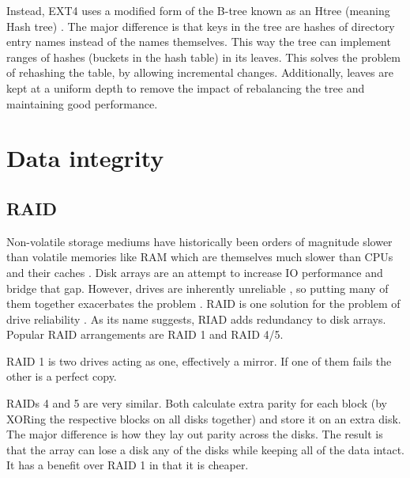             Instead, EXT4 uses a modified form of the B-tree known as an Htree
            (meaning Hash tree) \cite{Htree}. The major difference is that keys
            in the tree are hashes of directory entry names instead of the
            names themselves. This way the tree can implement ranges of hashes
            (buckets in the hash table) in its leaves. This solves the problem
            of rehashing the table, by allowing incremental changes.
            Additionally, leaves are kept at a uniform depth to remove the
            impact of rebalancing the tree and maintaining good performance.
    \section{Data integrity}

        \subsection{RAID}

            Non-volatile storage mediums have historically been orders of
            magnitude slower than volatile memories like RAM which are
            themselves much slower than CPUs and their caches \cite{raid has a
            Frank87, Stevens81}. Disk arrays are an attempt to increase IO
            performance and bridge that gap. However, drives are inherently
            unreliable \cite{pls (backblaze is a killer source)}, so putting
            many of them together exacerbates the problem \cite{maybe also
            raid. he has an MTTF caluclation}.  RAID is one solution for the
            problem of drive reliability \cite{RAID}. As its name suggests,
            RIAD adds redundancy to disk arrays. Popular RAID arrangements are
            RAID 1 and RAID 4/5.

            RAID 1 is two drives acting as one, effectively a mirror. If one of
            them fails the other is a perfect copy.

            RAIDs 4 and 5 are very similar. Both calculate extra parity for
            each block (by XORing the respective blocks on all disks together)
            and store it on an extra disk. The major difference is how they lay
            out parity across the disks. The result is that the array can lose
            a disk any of the disks while keeping all of the data intact. It
            has a benefit over RAID 1 in that it is cheaper.

